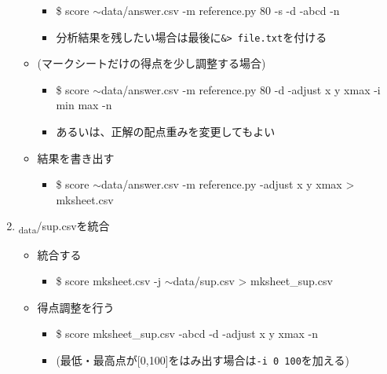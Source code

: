 \begin{enumerate}
\begin{itemize}
\begin{itemize}
\item \$ score \ensuremath{\sim}data\slash answer.csv -m reference.py 80 -s -d -abcd -n

\item 分析結果を残したい場合は最後に\texttt{\&> file.txt}を付ける

\end{itemize}

\item (マークシートだけの得点を少し調整する場合)

\begin{itemize}
\item \$ score \ensuremath{\sim}data\slash answer.csv -m reference.py 80 -d -adjust x y xmax -i min max -n

\item あるいは、正解の配点重みを変更してもよい

\end{itemize}

\item 結果を書き出す

\begin{itemize}
\item \$ score \ensuremath{\sim}data\slash answer.csv -m reference.py -adjust x y xmax > mksheet.csv

\end{itemize}

\end{itemize}

\item \textsubscript{data}\slash sup.csvを統合

\begin{itemize}
\item 統合する

\begin{itemize}
\item \$ score mksheet.csv -j \ensuremath{\sim}data\slash sup.csv > mksheet\_sup.csv

\end{itemize}

\item 得点調整を行う

\begin{itemize}
\item \$ score mksheet\_sup.csv -abcd -d -adjust x y xmax -n

\item (最低・最高点が{[0,100]}をはみ出す場合は\texttt{-i 0 100}を加える)


\end{itemize}
\end{itemize}
\end{enumerate}
